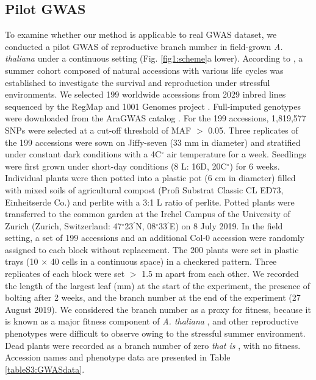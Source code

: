 \documentclass[12pt,]{article}
\begin{document}
\subsection{Pilot GWAS}
To examine whether our method is applicable to real GWAS dataset, we conducted a pilot GWAS of reproductive branch number in  field-grown \textit{A. thaliana} under a continuous setting (Fig. \ref{fig1:scheme}a lower). According to \cite{sato2019plant}, a summer cohort composed of natural accessions with various life cycles was established to investigate the survival and reproduction under stressful environments. We selected 199 worldwide accessions from 2029 inbred lines sequenced by the RegMap \citep{horton_genome-wide_2012} and 1001 Genomes project \citep{alonso-blanco_1135_2016}. Full-imputed genotypes were downloaded from the AraGWAS catalog \citep{togninalli_aragwas_2018}. For the 199 accessions, 1,819,577 SNPs were selected at a cut-off threshold of MAF $>$ 0.05. Three replicates of the 199 accessions were sown on Jiffy-seven (33 mm in diameter) and stratified under constant dark conditions with a 4C$^{\circ}$ air temperature for a week. Seedlings were first grown under short-day conditions (8 L: 16D, 20C$^{\circ}$) for 6 weeks. Individual plants were then potted into a plastic pot (6 cm in diameter) filled with mixed soils of agricultural compost (Profi Substrat Classic CL ED73, Einheitserde Co.) and perlite with a 3:1 L ratio of perlite. Potted plants were transferred to the common garden at the Irchel Campus of the University of Zurich (Zurich, Switzerland: 47$^\circ$23$^\prime$N, 08$^\circ$33$^\prime$E) on 8 July 2019. In the field setting, a set of 199 accessions and an additional Col-0 accession were randomly assigned to each block without replacement. The 200 plants were set in plastic trays (10 $\times$ 40 cells in a continuous space) in a checkered pattern. Three replicates of each block were set $>$ 1.5 m apart from each other. We recorded the length of the largest leaf (mm) at the start of the experiment, the presence of bolting after 2 weeks, and the branch number at the end of the experiment (27 August 2019). We considered the branch number as a proxy for fitness, because it is known as a major fitness component of \textit{A. thaliana} \citep{chong2018note}, and other reproductive phenotypes were difficult to observe owing to the stressful summer environment. Dead plants were recorded as a branch number of zero \textit{ that is }, with no fitness. Accession names and phenotype data are presented in Table \ref{tableS3:GWASdata}.
\end{document}
